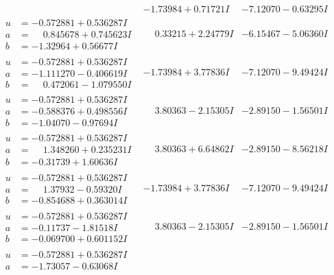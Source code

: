 \documentclass[1p]{elsarticle_modified}
\theoremstyle{definition}
\begin{document}
$$\begin{array}{c|c|c}
 & -1.73984 + 0.71721 I & -7.12070 - 0.63295 I \\ \hline\begin{aligned}
u &= -0.572881 + 0.536287 I \\
a &= \phantom{-}0.845678 + 0.745623 I \\
b &= -1.32964 + 0.56677 I\end{aligned}
 & \phantom{-}0.33215 + 2.24779 I & -6.15467 - 5.06360 I \\ \hline\begin{aligned}
u &= -0.572881 + 0.536287 I \\
a &= -1.111270 - 0.406619 I \\
b &= \phantom{-}0.472061 - 1.079550 I\end{aligned}
 & -1.73984 + 3.77836 I & -7.12070 - 9.49424 I \\ \hline\begin{aligned}
u &= -0.572881 + 0.536287 I \\
a &= -0.588376 + 0.498556 I \\
b &= -1.04070 - 0.97694 I\end{aligned}
 & \phantom{-}3.80363 - 2.15305 I & -2.89150 - 1.56501 I \\ \hline\begin{aligned}
u &= -0.572881 + 0.536287 I \\
a &= \phantom{-}1.348260 + 0.235231 I \\
b &= -0.31739 + 1.60636 I\end{aligned}
 & \phantom{-}3.80363 + 6.64862 I & -2.89150 - 8.56218 I \\ \hline\begin{aligned}
u &= -0.572881 + 0.536287 I \\
a &= \phantom{-}1.37932 - 0.59320 I \\
b &= -0.854688 + 0.363014 I\end{aligned}
 & -1.73984 + 3.77836 I & -7.12070 - 9.49424 I \\ \hline\begin{aligned}
u &= -0.572881 + 0.536287 I \\
a &= -0.11737 - 1.81518 I \\
b &= -0.069700 + 0.601152 I\end{aligned}
 & \phantom{-}3.80363 - 2.15305 I & -2.89150 - 1.56501 I \\ \hline\begin{aligned}
u &= -0.572881 + 0.536287 I \\
a &= -1.73057 - 0.63068 I \\

\end{aligned}
\end{array}$$
\end{document}
